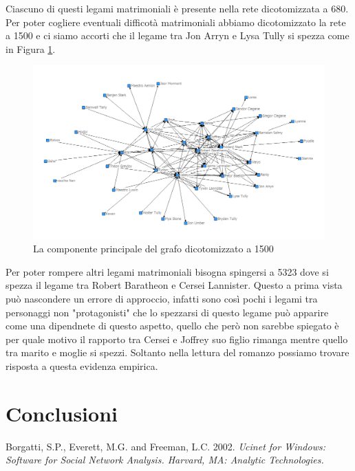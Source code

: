 \documentclass[a4paper]{article}
\begin{document}
Ciascuno di questi legami matrimoniali è presente nella rete dicotomizzata a 680.\\
Per poter cogliere eventuali difficotà matrimoniali abbiamo dicotomizzato la rete a 1500 e ci siamo accorti che il legame tra Jon Arryn e Lysa Tully si spezza come in Figura \ref{fig:grafo-partito-1500}.\\
\begin{figure}[h]
\centering
\includegraphics[width=.9\textwidth]{picture/030.png}
\caption{La componente principale del grafo dicotomizzato a 1500}
\label{fig:grafo-partito-1500}
\end{figure}
Per poter rompere altri legami matrimoniali bisogna spingersi a 5323 dove si spezza il legame tra Robert Baratheon e Cersei Lannister. Questo a prima vista può nascondere un errore di approccio, infatti sono così pochi i legami tra personaggi non "protagonisti" che lo spezzarsi di questo legame può apparire come una dipendnete di questo aspetto, quello che però non sarebbe spiegato è per quale motivo il rapporto tra Cersei e Joffrey suo figlio rimanga mentre quello tra marito e moglie si spezzi. Soltanto nella lettura del romanzo possiamo trovare risposta a questa evidenza empirica.






\section{Conclusioni}


\begin{thebibliography}{9}
  	Borgatti, S.P., Everett, M.G. and Freeman, L.C. 2002. 		\emph{Ucinet for Windows: Software for Social Network Analysis. Harvard, MA: Analytic Technologies.} 
\end{thebibliography}
\end{document}
